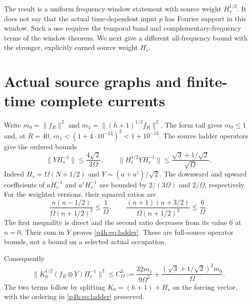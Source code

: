 \documentclass[11pt]{article}
\numberwithin{equation}{section}
\theoremstyle{definition}
\theoremstyle{remark}
\begin{document}
The result is a uniform frequency-window statement with source
weight $H_s^{1/2}$. It does not say that the actual time-dependent
input $p$ has Fourier support in this window. Such a use requires
the temporal band and complementary-frequency terms of the
window theorem. We next give a different all-frequency bound
with the stronger, explicitly earned source weight $H_s$.

\section{Actual source graphs and finite-time complete currents}
\label{p4h:sec:currents}

Write $m_0=\|f_R\|^2$ and
$m_1=\|(h+1)^{1/2}f_R\|^2$. The form tail gives
$m_0\leq1$ and, at $R=40$, $m_1<(1+4\cdot10^{-14})^2
<1+10^{-12}$.
The source ladder operators give the ordered bounds
\begin{equation}\label{p4h:eq:ladder}
 \|YH_s^{-1}\|\leq\frac{4\sqrt2}{3\Omega},\qquad
 \|H_s^{1/2}YH_s^{-1}\|
       \leq\frac{\sqrt3+1/\sqrt2}{\sqrt\Omega}.
\end{equation}
Indeed $H_s=\Omega(N+1/2)$ and $Y=(a+a^\dagger)/\sqrt2$.
The downward and upward coefficients of $aH_s^{-1}$ and
$a^\dagger H_s^{-1}$ are bounded by
$2/(3\Omega)$ and $2/\Omega$, respectively.
For the weighted versions, their squared ratios are
\[
 \frac{n(n-1/2)}{\Omega(n+1/2)^2}\leq\frac1\Omega,\qquad
 \frac{(n+1)(n+3/2)}{\Omega(n+1/2)^2}\leq\frac6\Omega.
\]
The first inequality is direct and the second ratio decreases
from its value $6$ at $n=0$. Their sum in $Y$ proves
\eqref{p4h:eq:ladder}. These are full-source operator bounds,
not a bound on a selected actual occupation.

Consequently
\begin{equation}\label{p4h:eq:Comega}
 \|K_0^{1/2}(f_R\otimes Y)H_s^{-1}\|^2
 \leq C_\Omega^2:=
 \frac{32m_1}{9\Omega^2}
 +\frac{(\sqrt3+1/\sqrt2)^2m_0}{\Omega}.
\end{equation}
The two terms follow by splitting
$K_0=(h+1)+H_s$ on the forcing vector, with the ordering
in \eqref{p4h:eq:ladder} preserved.
\end{document}
